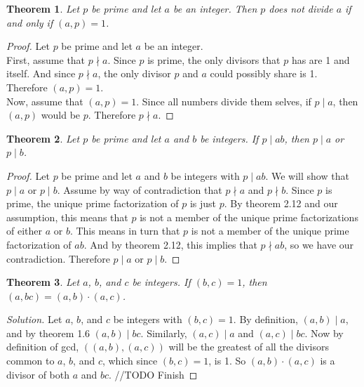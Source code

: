 \documentclass[12pt,leqno]{article}
\numberwithin{equation}{section}
\newtheorem{thm}{Theorem}[section]
\theoremstyle{definition}
\begin{document}

\begin{thm}
Let $p$ be prime and let $a$ be an integer.  Then $p$ does not divide $a$ if and only if $(a, p) = 1$.
\end{thm}

\begin{proof}[Proof]
Let $p$ be prime and let $a$ be an integer.\\
First, assume that $p \nmid a$.  Since $p$ is prime, the only divisors that $p$ has are 1 and itself.  And since $p \nmid a$, the only divisor $p$ and $a$ could possibly share is 1.  Therefore $(a, p) = 1$.\\
Now, assume that $(a, p) = 1$.  Since all numbers divide them selves, if $p \mid a$, then $(a, p)$ would be $p$.  Therefore $p \nmid a$.
\end{proof}

\pagebreak

\begin{thm}
Let $p$ be prime and let $a$ and $b$ be integers. If $p \mid ab$, then $p\mid a$ or $p \mid b$.
\end{thm}

\begin{proof}[Proof]
Let $p$ be prime and let $a$ and $b$ be integers with $p \mid ab$. We will show that $p\mid a$ or $p \mid b$. Assume by way of contradiction that $p\nmid a$ and $p \nmid b$.  Since $p$ is prime, the unique prime factorization of $p$ is just $p$.  By theorem 2.12 and our assumption, this means that $p$ is not a member of the unique prime factorizations of either $a$ or $b$.  This means in turn that $p$ is not a member of the unique prime factorization of $ab$.  And by theorem 2.12, this implies that $p \nmid ab$, so we have our contradiction.  Therefore $p\mid a$ or $p \mid b$.
\end{proof}


\begin{thm}
Let $a$, $b$, and $c$ be integers.  If $(b, c) = 1$, then $(a, bc) = (a, b) \cdot (a, c)$.
\end{thm}

\begin{proof}[Solution]
Let $a$, $b$, and $c$ be integers with $(b, c) = 1$.  By definition, $(a, b) \mid a$, and by theorem 1.6 $(a, b) \mid bc$.  Similarly, $(a, c) \mid a$ and $(a, c) \mid bc$.  Now by definition of gcd, $((a, b), (a, c))$ will be the greatest of all the divisors common to $a$, $b$, and $c$, which since $(b, c) = 1$, is 1.  So $(a, b) \cdot (a, c)$ is a divisor of both $a$ and $bc$.  //TODO Finish
\end{proof}
\end{document}
